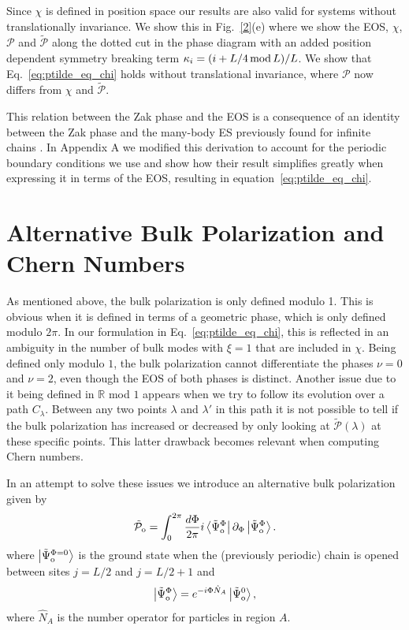 \documentclass[twocolumn,amsmath,longbibliography,amssymb,superscriptaddress]{revtex4-1}
\newcommand{\tpo}{\tilde{\mathcal{P}}_{\rm o}}
\newcommand{\brapsio}[1]{\bra{\tilde{\Psi}_{{\rm o}}^#1}}
\newcommand{\ketpsio}[1]{\ket{\tilde{\Psi}_{{\rm o}}^#1}}
\begin{document}
Since $\chi$ is defined in position space our results are also valid for systems without translationally invariance. We show this in Fig.~\ref{2}(e) where we show the EOS, $\chi$, $\mathcal{P}$ and $\tilde{\mathcal{P}}$ along the dotted cut in the phase diagram with an added position dependent symmetry breaking term $\kappa_i = (i+L/4 \, {\rm mod}\, L)/L$. We show that Eq.~\eqref{eq:ptilde_eq_chi} holds without translational invariance, where $\mathcal{P}$ now differs from $\chi$ and $\tilde{\mathcal{P}}$.

This relation between the Zak phase and the EOS is a consequence of an identity between the Zak phase and the many-body ES previously found for infinite chains \cite{Zaletel2014}. In Appendix A we modified this derivation to account for the periodic boundary conditions we use and show how their result simplifies greatly when expressing it in terms of the EOS, resulting in equation~\eqref{eq:ptilde_eq_chi}.





\section{Alternative Bulk Polarization and Chern Numbers}

As mentioned above, the bulk polarization is only defined modulo 1. This is obvious when it is defined in terms of a geometric phase, which is only defined modulo $2\pi$. In our formulation in Eq.~\eqref{eq:ptilde_eq_chi}, this is reflected in an ambiguity in the number of bulk modes with $\xi = 1$ that are included in $\chi$. Being defined only modulo $1$, the bulk polarization cannot differentiate the phases $\nu=0$ and $\nu=2$, even though the EOS of both phases is distinct. Another issue due to it being defined in $\mathbb{R}$ mod $1$ appears when we try to follow its evolution over a path $C_\lambda$. Between any two points $\lambda$ and $\lambda'$ in this path it is not possible to tell if the bulk polarization has increased or decreased by only looking at $\tilde{\mathcal{P}}(\lambda)$ at these specific points.
 This latter drawback becomes relevant when computing Chern numbers.

In an attempt to solve these issues we introduce an alternative bulk polarization given by
\begin{equation}\label{eq:tpo}
\tpo = \int_0^{2\pi}\frac{d\Phi}{2\pi} i\brapsio{\Phi}\partial_\Phi \ketpsio{\Phi}.
\end{equation}
where $\ketpsio{{\Phi=0}}$ is the ground state when the (previously periodic) chain is opened between sites $j=L/2$ and $j=L/2+1$ and 
\begin{equation}
\ketpsio{\Phi} =e^{-i \Phi \hat{N}_A} \ketpsio{0},
\label{eq:gauge}
\end{equation}
where $\hat{N}_A$ is the number operator for particles in region $A$.
\end{document}
